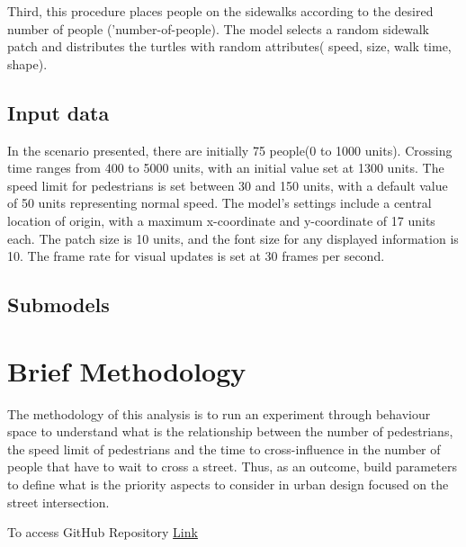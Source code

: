 \documentclass[10pt]{report}
\numberwithin{figure}{section}
\numberwithin{table}{section}
\begin{document}
Third, this procedure places people on the sidewalks according to the desired number of people ('number-of-people). The model selects a random sidewalk patch and distributes the turtles with random attributes( speed, size, walk time, shape).



\subsection{Input data}

In the scenario presented, there are initially 75 people(0 to 1000 units). Crossing time ranges from 400 to 5000 units, with an initial value set at 1300 units. The speed limit for pedestrians is set between 30 and 150 units, with a default value of 50 units representing normal speed. The model's settings include a central location of origin, with a maximum x-coordinate and y-coordinate of 17 units each. The patch size is 10 units, and the font size for any displayed information is 10. The frame rate for visual updates is set at 30 frames per second.


\subsection{Submodels}





\section{Brief Methodology }

The methodology of this analysis is to run an experiment through behaviour space to understand what is the relationship between the number of pedestrians, the speed limit of pedestrians and the time to cross-influence in the number of people that have to wait to cross a street. Thus, as an outcome, build parameters to define what is the priority aspects to consider in urban design focused on the street intersection.








\newpage
\printbibliography[title = {References}]

\vspace{5mm} %

To access GitHub Repository \href{https://github.com/brfelipealmeida/ABM_coursework}{Link}
\end{document}
